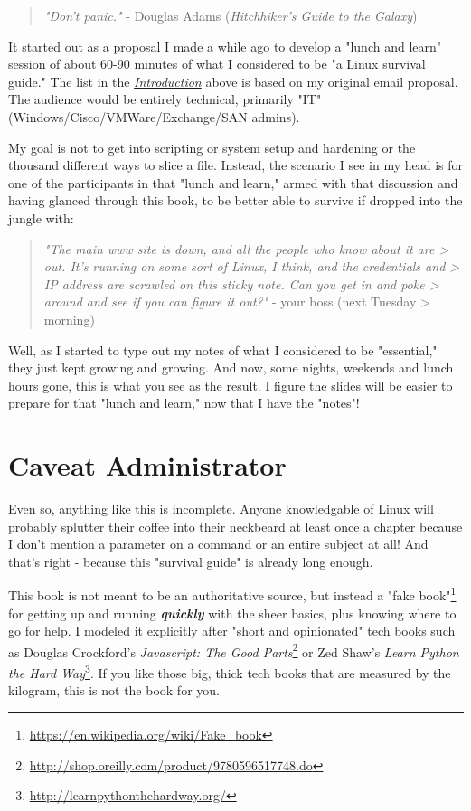 \documentclass[10pt,]{book}
\renewcommand{\href}[2]{#2\footnote{\url{#1}}}
\numberwithin{figure}{chapter}
\begin{document}
\begin{quote}
\emph{"Don't panic."} - Douglas Adams (\emph{Hitchhiker's Guide to the
Galaxy})
\end{quote}

It started out as a proposal I made a while ago to develop a "lunch and
learn" session of about 60-90 minutes of what I considered to be "a
Linux survival guide." The list in the
\hyperref[introduction]{\emph{Introduction}} above is based on my
original email proposal. The audience would be entirely technical,
primarily "IT" (Windows/Cisco/VMWare/Exchange/SAN admins).

My goal is not to get into scripting or system setup and hardening or
the thousand different ways to slice a file. Instead, the scenario I see
in my head is for one of the participants in that "lunch and learn,"
armed with that discussion and having glanced through this book, to be
better able to survive if dropped into the jungle with:

\begin{quote}
\emph{"The main www site is down, and all the people who know about it
are \textgreater{} out. It's running on some sort of Linux, I think, and
the credentials and \textgreater{} IP address are scrawled on this
sticky note. Can you get in and poke \textgreater{} around and see if
you can figure it out?"} - your boss (next Tuesday \textgreater{}
morning)
\end{quote}

Well, as I started to type out my notes of what I considered to be
"essential," they just kept growing and growing. And now, some nights,
weekends and lunch hours gone, this is what you see as the result. I
figure the slides will be easier to prepare for that "lunch and learn,"
now that I have the "notes"!

\section*{Caveat Administrator}\label{caveat-administrator}

Even so, anything like this is incomplete. Anyone knowledgable of Linux
will probably splutter their coffee into their neckbeard at least once a
chapter because I don't mention a parameter on a command or an entire
subject at all! And that's right - because this "survival guide" is
already long enough.

This book is not meant to be an authoritative source, but instead a
\href{https://en.wikipedia.org/wiki/Fake_book}{"fake book"} for getting
up and running \textbf{\emph{quickly}} with the sheer basics, plus
knowing where to go for help. I modeled it explicitly after "short and
opinionated" tech books such as Douglas Crockford's
\href{http://shop.oreilly.com/product/9780596517748.do}{\emph{Javascript:
The Good Parts}} or Zed Shaw's
\href{http://learnpythonthehardway.org/}{\emph{Learn Python the Hard
Way}}. If you like those big, thick tech books that are measured by the
kilogram, this is not the book for you.
\end{document}
